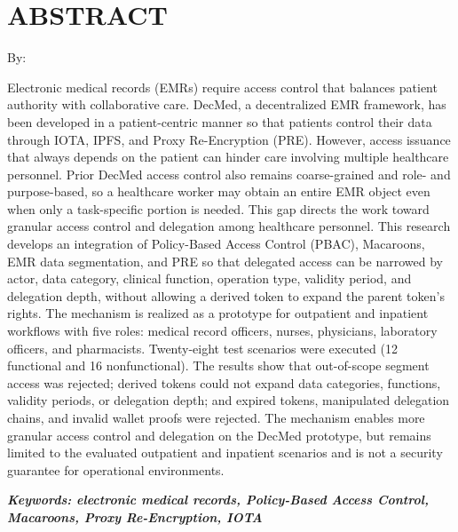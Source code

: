 \clearpage
\chapter*{ABSTRACT}

\begin{center}
	\center
	\begin{singlespace}
		\large\bfseries\MakeUppercase{\thetitle}

		\normalfont\normalsize
		By:

		\bfseries \theauthor
	\end{singlespace}
\end{center}

\begin{singlespace}
	\small
	Electronic medical records (EMRs) require access control that balances patient authority with collaborative care. DecMed, a decentralized EMR framework, has been developed in a patient-centric manner so that patients control their data through IOTA, IPFS, and Proxy Re-Encryption (PRE). However, access issuance that always depends on the patient can hinder care involving multiple healthcare personnel. Prior DecMed access control also remains coarse-grained and role- and purpose-based, so a healthcare worker may obtain an entire EMR object even when only a task-specific portion is needed. This gap directs the work toward granular access control and delegation among healthcare personnel. This research develops an integration of Policy-Based Access Control (PBAC), Macaroons, EMR data segmentation, and PRE so that delegated access can be narrowed by actor, data category, clinical function, operation type, validity period, and delegation depth, without allowing a derived token to expand the parent token's rights. The mechanism is realized as a prototype for outpatient and inpatient workflows with five roles: medical record officers, nurses, physicians, laboratory officers, and pharmacists. Twenty-eight test scenarios were executed (12 functional and 16 nonfunctional). The results show that out-of-scope segment access was rejected; derived tokens could not expand data categories, functions, validity periods, or delegation depth; and expired tokens, manipulated delegation chains, and invalid wallet proofs were rejected. The mechanism enables more granular access control and delegation on the DecMed prototype, but remains limited to the evaluated outpatient and inpatient scenarios and is not a security guarantee for operational environments.

	\textbf{\textit{Keywords: electronic medical records, Policy-Based Access Control, Macaroons, Proxy Re-Encryption, IOTA}}
\end{singlespace}
\clearpage
